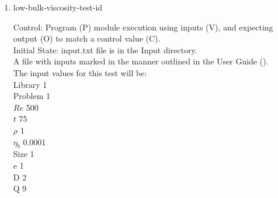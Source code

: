\documentclass[12pt, titlepage]{article}
\newcommand{\famname}{Lattice Boltzmann Solver}
\newcounter{testcounter} %
\begin{document}
\begin{enumerate}
Output: Vorticity vector values printed to the screen. \\

Test Case Derivation: This case is a comparison with the pseudo-oracle
pyLBM. The C values of this test for pyLBM can be found in the file
id8output.txt located in the OracleOutput folder. The output values of {\famname} will be compared to the pseudo-oracle output values.\\

This test covers the high bound for density using a density close to that of mercury.\\
					
How test will be performed: 

\begin{enumerate}
\item The Von Karman Vortex Street module shall be modified by the author to
  print the vorticity vector as output.
\item Outside of the system, the input parameter values will be written to a text file titled input.txt, as outlined in the User Guide.
\item The file will be placed into the Input directory, under the home directory of the project.
\item {\famname} shall be run.
\item Upon completion of the module, the output values of the vorticity vector
  will be compared to the vorticity vector values from pyLBM - comparison will
  be done per cell. Comparisons can be done manually using Excel, or through a
  script, using the equation for relative error found in Section \ref{eqerror}.
\end{enumerate}

\item{low-bulk-viscosity-test-id\thetestcounter \\}

Control: Program (P) module execution using inputs (V), and expecting output (O) to match a control value (C).\\
					
Initial State: input.txt file is in the Input directory.\\
					
A file with inputs marked in the manner outlined in the User
Guide (\citet{LBM_UserGuide_PM}).\\The input values for this test will be:\\
  Library 1\\
Problem 1\\
$Re$ 500\\
$t$ 75\\
$\rho$ 1\\
$\eta_b$ 0.0001\\
Size 1\\
$\mathrm{e}$ 1\\
$\mathrm{D}$ 2\\
$\mathrm{Q}$ 9\\


\end{enumerate}
\end{document}
